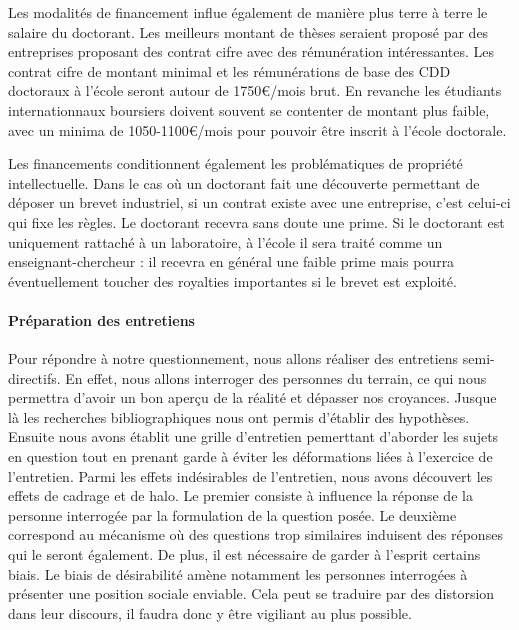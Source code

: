 \documentclass[12pt]{article}
\begin{document}
Les modalités de financement influe également de manière plus terre à terre le salaire du doctorant. Les meilleurs montant de thèses seraient proposé par des entreprises proposant des contrat cifre avec des rémunération intéressantes. Les contrat cifre de montant minimal et les rémunérations de base des CDD doctoraux à l'école seront autour de 1750€/mois brut. En revanche les étudiants internationnaux boursiers doivent souvent se contenter de montant plus faible, avec un minima de 1050-1100€/mois pour pouvoir être inscrit à l'école doctorale.

Les financements conditionnent également les problématiques de propriété intellectuelle. Dans le cas où un doctorant fait une découverte permettant de déposer un brevet industriel, si un contrat existe avec une entreprise, c'est celui-ci qui fixe les règles. Le doctorant recevra sans doute une prime. Si le doctorant est uniquement rattaché à un laboratoire, à l'école il sera traité comme un enseignant-chercheur : il recevra en général une faible prime mais pourra éventuellement toucher des royalties importantes si le brevet est exploité. 

\paragraph{Préparation des entretiens}

Pour répondre à notre questionnement, nous allons réaliser des entretiens semi-directifs. En effet, nous allons interroger des personnes du terrain, ce qui nous permettra d'avoir un bon aperçu de la réalité et dépasser nos croyances. Jusque là les recherches bibliographiques nous ont permis d'établir des hypothèses. Ensuite nous avons établit une grille d'entretien pemerttant d'aborder les sujets en question tout en prenant garde à éviter les déformations liées à l'exercice de l'entretien. Parmi les effets indésirables de l'entretien, nous avons découvert les effets de cadrage et de halo. Le premier consiste à influence la réponse de la personne interrogée par la formulation de la question posée. Le deuxième correspond au mécanisme où des questions trop similaires induisent des réponses qui le seront également. De plus, il est nécessaire de garder à l'esprit certains biais. Le biais de désirabilité amène notamment les personnes interrogées à présenter une position sociale enviable. Cela peut se traduire par des distorsion dans leur discours, il faudra donc y être vigiliant au plus possible.
\end{document}
